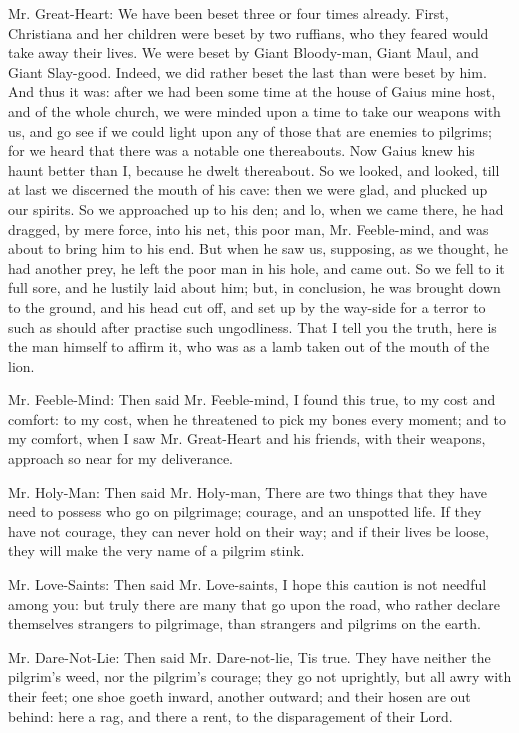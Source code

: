 Mr. Great-Heart: We have been beset three or four times already. First, Christiana and her children were beset by two ruffians, who they feared would take away their lives. We were beset by Giant Bloody-man, Giant Maul, and Giant Slay-good. Indeed, we did rather beset the last than were beset by him. And thus it was: after we had been some time at the house of Gaius mine host, and of the whole church, we were minded upon a time to take our weapons with us, and go see if we could light upon any of those that are enemies to pilgrims; for we heard that there was a notable one thereabouts. Now Gaius knew his haunt better than I, because he dwelt thereabout. So we looked, and looked, till at last we discerned the mouth of his cave: then we were glad, and plucked up our spirits. So we approached up to his den; and lo, when we came there, he had dragged, by mere force, into his net, this poor man, Mr. Feeble-mind, and was about to bring him to his end. But when he saw us, supposing, as we thought, he had another prey, he left the poor man in his hole, and came out. So we fell to it full sore, and he lustily laid about him; but, in conclusion, he was brought down to the ground, and his head cut off, and set up by the way-side for a terror to such as should after practise such ungodliness. That I tell you the truth, here is the man himself to affirm it, who was as a lamb taken out of the mouth of the lion.

Mr. Feeble-Mind: Then said Mr. Feeble-mind, I found this true, to my cost and comfort: to my cost, when he threatened to pick my bones every moment; and to my comfort, when I saw Mr. Great-Heart and his friends, with their weapons, approach so near for my deliverance.

Mr. Holy-Man: Then said Mr. Holy-man, There are two things that they have need to possess who go on pilgrimage; courage, and an unspotted life. If they have not courage, they can never hold on their way; and if their lives be loose, they will make the very name of a pilgrim stink.

Mr. Love-Saints: Then said Mr. Love-saints, I hope this caution is not needful among you: but truly there are many that go upon the road, who rather declare themselves strangers to pilgrimage, than strangers and pilgrims on the earth.

Mr. Dare-Not-Lie: Then said Mr. Dare-not-lie, Tis true. They have neither the pilgrim's weed, nor the pilgrim's courage; they go not uprightly, but all awry with their feet; one shoe goeth inward, another outward; and their hosen are out behind: here a rag, and there a rent, to the disparagement of their Lord.

